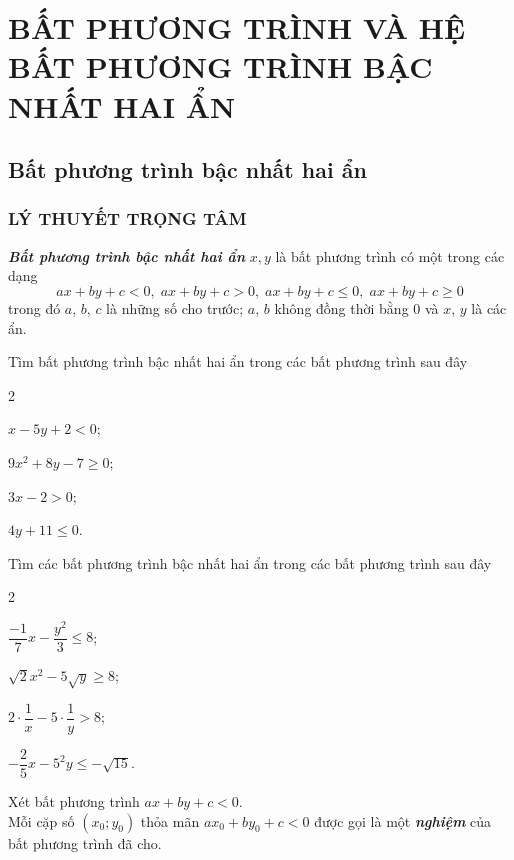 \chapter{BẤT PHƯƠNG TRÌNH VÀ HỆ BẤT PHƯƠNG TRÌNH BẬC NHẤT HAI ẨN}
\section{Bất phương trình bậc nhất hai ẩn}

\subsection{LÝ THUYẾT TRỌNG TÂM}

\begin{kttrongtam}
	\textbf{\textit{Bất phương trình bậc nhất hai ẩn}} $x, y$ là bất phương trình có một trong các dạng
	$$ax+by+c<0,\; ax+by+c>0 ,\; ax+by+c \leq 0 ,\; a x+b y+c \geq 0$$
	trong đó $a$, $b$, $c$ là những số cho trước; $a$, $b$ không đồng thời bằng $0$ và $x$, $y$ là các ẩn.
\end{kttrongtam}

\begin{vd}%
	Tìm bất phương trình bậc nhất hai ẩn trong các bất phương trình sau đây
	\begin{enumEX}{2}
		\item[a)] $x-5y+2 < 0$;
		\item[b)] $9x^2+8y-7 \geq 0$;
		\item[c)] $3x-2>0$;
		\item[d)] $4y+11 \leq 0$.
	\end{enumEX}
\end{vd}
\begin{vd}%
 	Tìm các bất phương trình bậc nhất hai ẩn trong các bất phương trình sau đây
 	\begin{enumEX}{2}
		\item[a)] $\dfrac{-1}{7}x-\dfrac{y^2}{3} \le 8$;
		\item[b)] $\sqrt{2} x^2-5 \sqrt{y} \ge 8$;
		\item[c)] $2 \cdot \dfrac{1}{x}-5\cdot \dfrac{1}{y}>8$;
		\item[d)] $-\dfrac{2}{5} x-5^2 y \leq-\sqrt{15}$.
	\end{enumEX}
 \end{vd}
\begin{kttrongtam}
	Xét bất phương trình $ax+by+c<0$.\\
	Mỗi cặp số $(x_0;y_0)$ thỏa mãn $ax_0+by_0+c<0$ được gọi là một \textbf{\textit{nghiệm}} của bất phương trình đã cho.
\end{kttrongtam}

